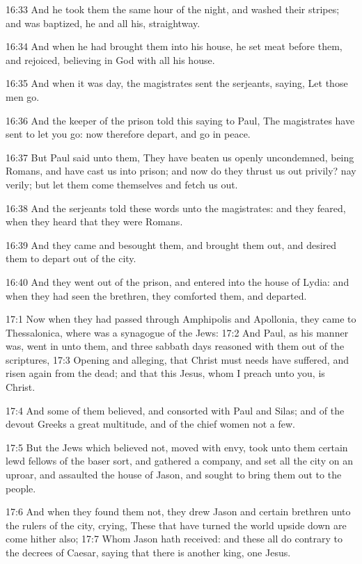 16:33 And he took them the same hour of the night, and washed their
stripes; and was baptized, he and all his, straightway.

16:34 And when he had brought them into his house, he set meat before
them, and rejoiced, believing in God with all his house.

16:35 And when it was day, the magistrates sent the serjeants, saying,
Let those men go.

16:36 And the keeper of the prison told this saying to Paul, The
magistrates have sent to let you go: now therefore depart, and go in
peace.

16:37 But Paul said unto them, They have beaten us openly uncondemned,
being Romans, and have cast us into prison; and now do they thrust us
out privily? nay verily; but let them come themselves and fetch us
out.

16:38 And the serjeants told these words unto the magistrates: and
they feared, when they heard that they were Romans.

16:39 And they came and besought them, and brought them out, and
desired them to depart out of the city.

16:40 And they went out of the prison, and entered into the house of
Lydia: and when they had seen the brethren, they comforted them, and
departed.

17:1 Now when they had passed through Amphipolis and Apollonia, they
came to Thessalonica, where was a synagogue of the Jews: 17:2 And
Paul, as his manner was, went in unto them, and three sabbath days
reasoned with them out of the scriptures, 17:3 Opening and alleging,
that Christ must needs have suffered, and risen again from the dead;
and that this Jesus, whom I preach unto you, is Christ.

17:4 And some of them believed, and consorted with Paul and Silas; and
of the devout Greeks a great multitude, and of the chief women not a
few.

17:5 But the Jews which believed not, moved with envy, took unto them
certain lewd fellows of the baser sort, and gathered a company, and
set all the city on an uproar, and assaulted the house of Jason, and
sought to bring them out to the people.

17:6 And when they found them not, they drew Jason and certain
brethren unto the rulers of the city, crying, These that have turned
the world upside down are come hither also; 17:7 Whom Jason hath
received: and these all do contrary to the decrees of Caesar, saying
that there is another king, one Jesus.

